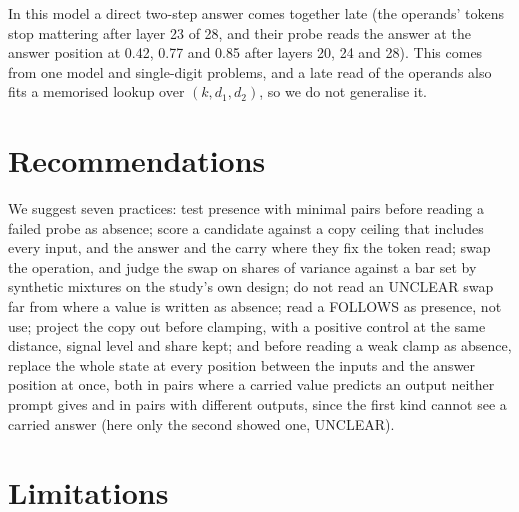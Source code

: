 \documentclass{article}
\begin{document}
In this model a direct two-step answer comes together late (the operands' tokens stop mattering after layer 23 of 28, and their probe reads the answer at the answer position at 0.42, 0.77 and 0.85 after layers 20, 24 and 28). This comes from one model and single-digit problems, and a late read of the operands also fits a memorised lookup over $(k, d_1, d_2)$, so we do not generalise it.

\section{Recommendations}\label{sec:recs}

We suggest seven practices: test presence with minimal pairs before reading a failed probe as absence; score a candidate against a copy ceiling that includes every input, and the answer and the carry where they fix the token read; swap the operation, and judge the swap on shares of variance against a bar set by synthetic mixtures on the study's own design; do not read an UNCLEAR swap far from where a value is written as absence; read a FOLLOWS as presence, not use; project the copy out before clamping, with a positive control at the same distance, signal level and share kept; and before reading a weak clamp as absence, replace the whole state at every position between the inputs and the answer position at once, both in pairs where a carried value predicts an output neither prompt gives and in pairs with different outputs, since the first kind cannot see a carried answer (here only the second showed one, UNCLEAR).

\section{Limitations}\label{sec:lim}
\end{document}
